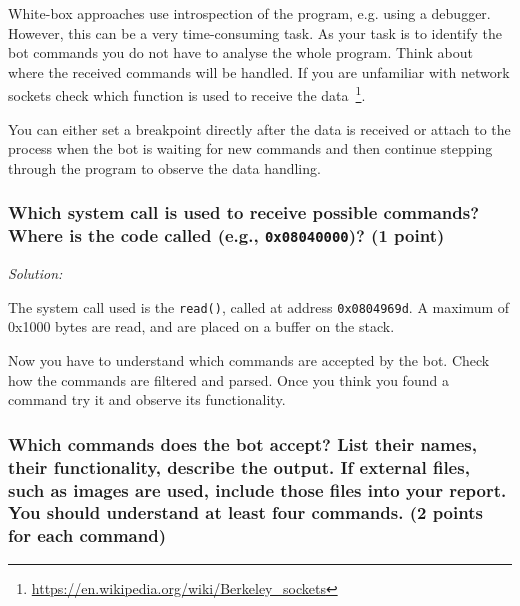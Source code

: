 \documentclass[a4paper,11pt]{article}
\newenvironment{solution}%
{\par{\noindent\small\textit{Solution:}}\vspace{-12pt}\begin{framed}}%
{\end{framed}\par}
\begin{document}
White-box approaches use introspection of the program, e.g. using a debugger.
However, this can be a very time-consuming task. As your task is to identify the
bot commands you do not have to analyse the whole program. Think about where the
received commands will be handled. If you are unfamiliar with network sockets
check which function is used to receive the
data~\footnote{\url{https://en.wikipedia.org/wiki/Berkeley_sockets}}.

You can either set a breakpoint directly after the data is received or attach to
the process when the bot is waiting for new commands and then continue stepping
through the program to observe the data handling.

\subsubsection*{Which system call is used to receive possible commands? Where is the code called (e.g., \texttt{0x08040000})? \ifsolution (1 point) \fi}
\ifsolution
\begin{solution}
	The system call used is the \texttt{read()}, called at address \texttt{0x0804969d}.
	A maximum of 0x1000 bytes are read, and are placed on a buffer on the stack.
\end{solution}\fi


Now you have to understand which commands are accepted by the bot. Check how the
commands are filtered and parsed. Once you think you found a command try it and
observe its functionality.

\subsubsection*{Which commands does the bot accept? List their names, their functionality, describe the output. If external files, such as images are used, include those files into your report. You should understand at least four commands.
\ifsolution (2 points for each command) \fi}
\end{document}
